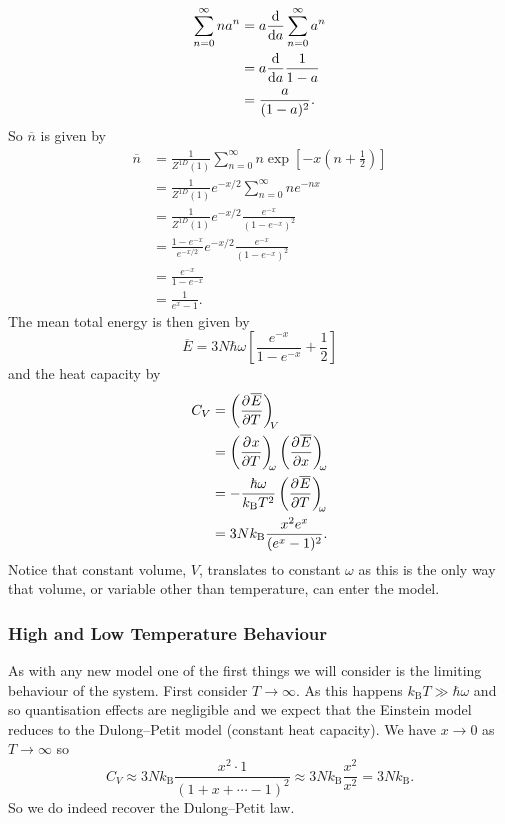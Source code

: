 \documentclass[a4paper]{article}
\newcommand{\boltzmann}{k_\mathrm{B}}
\newcommand{\mean}[1]{\overline{#1}}
\begin{document}
    \begin{align*}
        \sum_{n=0}^{\infty} na^n &= a\dv{a}\sum_{n=0}^{\infty}a^n\\
        &= a\dv{a}\frac{1}{1 - a}\\
        &= \frac{a}{(1 - a)^2}.
    \end{align*}
    So \(\mean{n}\) is given by
    \begin{align*}
        \mean{n} &= \frac{1}{Z^{1D}(1)} \sum_{n=0}^{\infty} n\exp\left[-x\left(n + \frac{1}{2}\right)\right]\\
        &= \frac{1}{Z^{1D}(1)} e^{-x/2} \sum_{n=0}^{\infty} ne^{-nx}\\
        &= \frac{1}{Z^{1D}(1)} e^{-x/2} \frac{e^{-x}}{(1 - e^{-x})^2}\\
        &= \frac{1 - e^{-x}}{e^{-x/2}} e^{-x/2} \frac{e^{-x}}{(1 - e^{-x})^2}\\
        &= \frac{e^{-x}}{1 - e^{-x}}\\
        &= \frac{1}{e^x - 1}.
    \end{align*}
    The mean total energy is then given by
    \[\mean{E} = 3N\hbar\omega\left[\frac{e^{-x}}{1 - e^{-x}} + \frac{1}{2}\right]\]
    and the heat capacity by
    \begin{align*}
        C_V &= \pdvconst{\mean{E}}{T}{V}\\
        &= \pdvconst{x}{T}{\omega}\pdvconst{\mean{E}}{x}{\omega}\\
        &= -\frac{\hbar\omega}{\boltzmann T^2} \pdvconst{\mean{E}}{T}{\omega}\\
        &= 3N\boltzmann \frac{x^2e^x}{(e^x - 1)^2}.
    \end{align*}
    Notice that constant volume, \(V\), translates to constant \(\omega\) as this is the only way that volume, or variable other than temperature, can enter the model.
    
    \subsubsection{High and Low Temperature Behaviour}
    As with any new model one of the first things we will consider is the limiting behaviour of the system.
    First consider \(T \to \infty\).
    As this happens \(\boltzmann T \gg \hbar\omega\) and so quantisation effects are negligible and we expect that the Einstein model reduces to the Dulong--Petit model (constant heat capacity).
    We have \(x \to 0\) as \(T\to\infty\) so
    \[C_V \approx 3N\boltzmann \frac{x^2\cdot 1}{(1 + x + \dotsb - 1)^2} \approx 3N\boltzmann\frac{x^2}{x^2} = 3N\boltzmann.\]
    So we do indeed recover the Dulong--Petit law.
    
\end{document}
